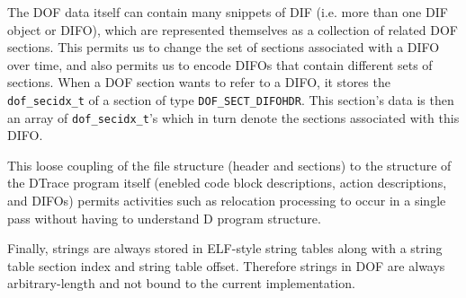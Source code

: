The DOF data itself can contain many snippets of DIF (i.e. more than
one DIF object or DIFO), which are represented themselves as a
collection of related DOF sections.  This permits us to change the set
of sections associated with a DIFO over time, and also permits us to
encode DIFOs that contain different sets of sections.  When a DOF
section wants to refer to a DIFO, it stores the \verb|dof_secidx_t| of
a section of type \verb|DOF_SECT_DIFOHDR|.  This section's data is
then an array of \verb|dof_secidx_t|'s which in turn denote the
sections associated with this DIFO.

This loose coupling of the file structure (header and sections) to the
structure of the DTrace program itself (enebled code block
descriptions, action descriptions, and DIFOs) permits activities such
as relocation processing to occur in a single pass without having to
understand D program structure.

Finally, strings are always stored in ELF-style string tables along
with a string table section index and string table offset.  Therefore
strings in DOF are always arbitrary-length and not bound to the
current implementation.


